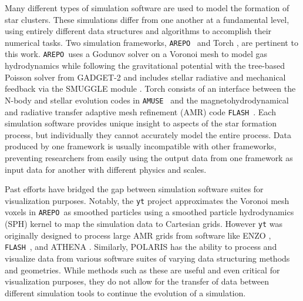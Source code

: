 \documentclass[twoside]{drexel-thesis}
\newcommand\flash{\texttt{FLASH}}
\newcommand\amuse{\texttt{AMUSE}}
\newcommand\arepo{\texttt{AREPO}}
\begin{document}
\begin{thesis}
Many different types of simulation software are used to model the formation of star clusters. These simulations differ from one another at a fundamental level, using entirely different data structures and algorithms to accomplish their numerical tasks. Two simulation frameworks, \arepo~\citep{springel_hydrodynamic_2010,weinberger_arepo_2020} and Torch \citep{wall_collisional_2019,wall_modeling_2020}, are pertinent to this work. \arepo~uses a Godunov solver on a Voronoi mesh to model gas hydrodynamics while following the gravitational potential with the tree-based Poisson solver from GADGET-2 \citep{springel_cosmological_2005}  and includes stellar radiative and mechanical feedback via the SMUGGLE module \citep{marinacci_simulating_2019,li_effects_2020}. Torch consists of an interface between the N-body and stellar evolution codes in \amuse~ \citep{portegies_zwart_multiphysics_2009,portegies_zwart_multi-physics_2013,pelupessy_astrophysical_2013,portegies_zwart_astrophysical_2018} and the magnetohydrodynamical and radiative transfer adaptive mesh refinement (AMR) code \flash\ \citep{fryxell_flash_2000,dubey_evolution_2014}. Each simulation software provides unique insight to aspects of the star formation process, but individually they cannot accurately model the entire process. Data produced by one framework is usually incompatible with other frameworks, preventing researchers from easily using the output data from one framework as input data for another with different physics and scales.

Past efforts have bridged the gap between simulation software suites for visualization purposes. Notably, the \texttt{yt} project \citep{turk_yt_2011} approximates the Voronoi mesh voxels in \arepo~as smoothed particles using a smoothed particle hydrodynamics (SPH) kernel to map the simulation data to Cartesian grids. However \texttt{yt} was originally designed to process large AMR grids from  
software like ENZO \citep{bryan_enzo_2014}, \flash~\citep{fryxell_flash_2000}, and ATHENA \citep{stone_athena_2008}. Similarly, POLARIS \citep{reissl_radiative_2016,reissl_radiative_2019} has the ability to process and visualize data from various software suites of varying data structuring methods and geometries. While methods such as these are useful and even critical for visualization purposes, they do not allow for the transfer of data between different simulation tools to continue the evolution of a simulation. 


\end{thesis}
\end{document}
